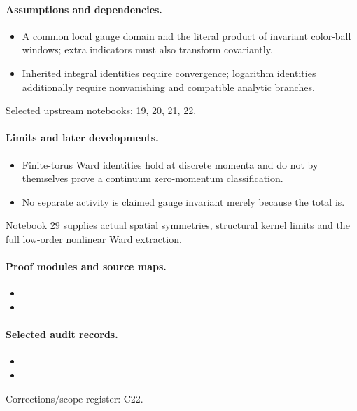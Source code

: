 \paragraph{Assumptions and dependencies.}
\begin{itemize}
\item A common local gauge domain and the literal product of invariant color-ball windows; extra indicators must also transform covariantly.
\item Inherited integral identities require convergence; logarithm identities additionally require nonvanishing and compatible analytic branches.
\end{itemize}

Selected upstream notebooks: 19, 20, 21, 22.\par

\paragraph{Limits and later developments.}
\begin{itemize}
\item Finite-torus Ward identities hold at discrete momenta and do not by themselves prove a continuum zero-momentum classification.
\item No separate activity is claimed gauge invariant merely because the total is.
\end{itemize}

Notebook 29 supplies actual spatial symmetries, structural kernel limits and the full low-order nonlinear Ward extraction.

\paragraph{Proof modules and source maps.}
\begingroup\small
\begin{itemize}
\item {}
\item {}
\end{itemize}
\endgroup

\paragraph{Selected audit records.}
\begingroup\small
\begin{itemize}
\item {}
\item {}
\end{itemize}
\endgroup
Corrections/scope register: C22.\par

